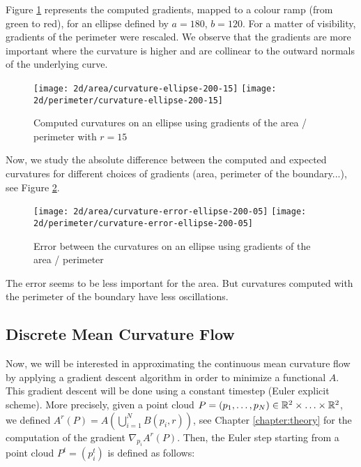 Figure \ref{fig:2d-curvature-ellipse} represents the computed gradients, mapped
to a colour ramp (from green to red), for an ellipse defined by $ a = 180 $, $ b
= 120 $. For a matter of visibility, gradients of the perimeter were rescaled.
We observe that the gradients are more important where the curvature is higher
and are collinear to the outward normals of the underlying curve.

\begin{figure}[h]
    \centering

    \texttt{[image: 2d/area/curvature-ellipse-200-15]}
    \texttt{[image: 2d/perimeter/curvature-ellipse-200-15]}
    \caption{Computed curvatures on an ellipse using gradients of the area /
        perimeter with $ r = 15 $}
    \label{fig:2d-curvature-ellipse}
\end{figure}

Now, we study the absolute difference between the computed and expected
curvatures for different choices of gradients (area, perimeter of the
boundary...), see Figure \ref{fig:2d-curvature-error-ellipse}.

\begin{figure}[h]
    \centering

    \texttt{[image: 2d/area/curvature-error-ellipse-200-05]}
    \texttt{[image: 2d/perimeter/curvature-error-ellipse-200-05]}
    \caption{Error between the curvatures on an ellipse using gradients of the
        area / perimeter}
    \label{fig:2d-curvature-error-ellipse}
\end{figure}

The error seems to be less important for the area. But curvatures computed with
the perimeter of the boundary have less oscillations.

\subsection{Discrete Mean Curvature Flow}

Now, we will be interested in approximating the continuous mean curvature flow
by applying a gradient descent algorithm in order to minimize a functional $ A
$. This gradient descent will be done using a constant timestep (Euler explicit
scheme). More precisely, given a point cloud $ P = (p_1, \ldots, p_N) \in \mathbb{R}^2
\times \ldots \times \mathbb{R}^2 $, we defined $ A^r(P) = A(\bigcup_{i=1}^N B(p_i, r))
$, see Chapter \ref{chapter:theory} for the computation of the gradient $
\nabla_{p_i} A^r(P) $. Then, the Euler step starting from a point cloud $ P^t =
(p_i^t) $ is defined as follows:


